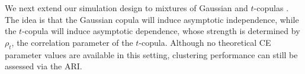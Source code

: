 \documentclass[
  12pt]{article}
\begin{document}
We next extend our simulation design to mixtures of Gaussian and $t$-copulas \citep{Demarta2007-ap}.
The idea is that the Gaussian copula will induce asymptotic independence, while the $t$-copula will induce asymptotic dependence, whose strength is determined by $\rho_{t}$, the correlation parameter of the $t$-copula.
Although no theoretical CE parameter values are available in this setting, clustering performance can still be assessed via the ARI.  

\end{document}
